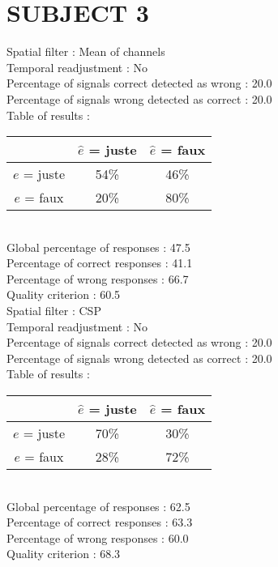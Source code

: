 \section*{SUBJECT 3}
Spatial filter : Mean of channels \\
Temporal readjustment : No \\
Percentage of signals correct detected as wrong :   20.0 \\
Percentage of signals wrong detected as correct :   20.0 \\
Table of results : \\
\begin{tabular}{|c|c|c|}
\hline				& $\hat{e}$ = juste & $\hat{e}$ = faux \\
\hline  $e$ = juste	&     54\%			&     46\%		\\
\hline  $e$ = faux	&     20\%			&     80\%		\\
\hline
\end{tabular}\\
Global percentage of responses :   47.5 \\
Percentage of correct responses :   41.1 \\
Percentage of wrong responses :   66.7 \\
Quality criterion :   60.5 \\

Spatial filter : CSP \\
Temporal readjustment : No \\
Percentage of signals correct detected as wrong :   20.0 \\
Percentage of signals wrong detected as correct :   20.0 \\
Table of results : \\
\begin{tabular}{|c|c|c|}
\hline				& $\hat{e}$ = juste & $\hat{e}$ = faux \\
\hline  $e$ = juste	&     70\%			&     30\%		\\
\hline  $e$ = faux	&     28\%			&     72\%		\\
\hline
\end{tabular}\\
Global percentage of responses :   62.5 \\
Percentage of correct responses :   63.3 \\
Percentage of wrong responses :   60.0 \\
Quality criterion :   68.3 \\

